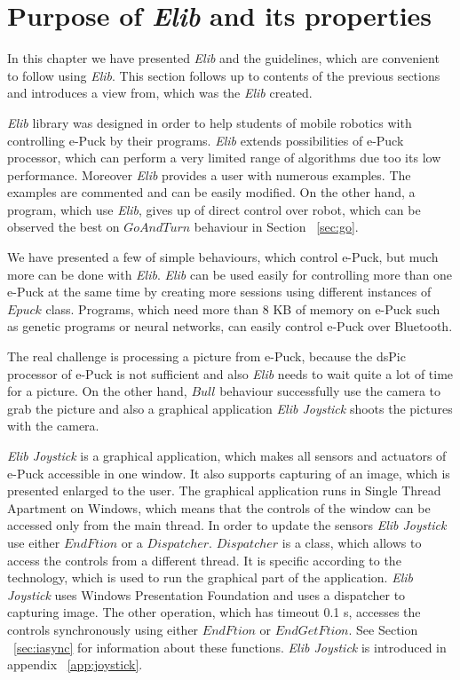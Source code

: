 \section{Purpose of {\it Elib} and its properties}
  In this chapter we have presented {\it Elib} and the guidelines, 
  which are convenient to follow using {\it Elib}. 
  This section follows up to contents of the previous sections and introduces a view from,
  which was the {\it Elib} created.

  {\it Elib} library was designed in order to help students of mobile robotics	
  with controlling e-Puck by their programs.
  {\it Elib} extends possibilities of e-Puck processor, 
  which can perform a very limited range of algorithms
  due too its low performance.
  Moreover {\it Elib} provides a user with numerous examples. The examples are commented
  and can be easily modified.
  On the other hand, a program, which use {\it Elib}, gives up of direct control over robot,
  which can be observed the best on $GoAndTurn$ behaviour in Section ~\ref{sec:go}.

  We have presented a few of simple behaviours, which control e-Puck, 
  but much more can be done with {\it Elib}.
  {\it Elib} can be used easily for controlling more than one e-Puck at the same time
  by creating more sessions using
  different instances of $Epuck$ class. Programs, which need more than 8 KB of memory on e-Puck such 
  as genetic programs or neural networks, can easily control e-Puck over Bluetooth.

  The real challenge is processing a picture from e-Puck, 
  because the dsPic processor of e-Puck is not sufficient
  and also {\it Elib} needs to wait quite a lot of time for a picture.
  On the other hand, $Bull$ behaviour successfully use the camera to grab the picture
  and also a graphical application {\it Elib Joystick} shoots the pictures with the camera.

  {\it Elib Joystick} is a graphical application, which makes all sensors and actuators of e-Puck accessible in one window.
  It also supports capturing of an image, which is presented enlarged to the user.
  The graphical application runs in Single Thread Apartment on Windows, which means that the controls of the window can 
  be accessed only from the main thread.
  In order to update the sensors {\it Elib Joystick} use either $EndFtion$ or a $Dispatcher$.
  $Dispatcher$ is a class, which allows to access the controls from a different thread. 
  It is specific according to the technology,
  which is used to run the graphical part of the application. 
  {\it Elib Joystick} uses Windows Presentation Foundation and
  uses a dispatcher to capturing image. The other operation, 
  which has timeout 0.1 s, accesses the controls synchronously using
  either $EndFtion$ or $EndGetFtion$. See Section ~\ref{sec:iasync} for information 
  about these functions. {\it Elib Joystick} is introduced in appendix ~\ref{app:joystick}.

